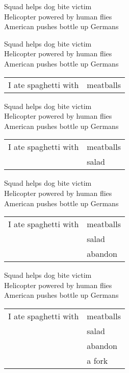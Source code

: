 \documentclass{article}
\begin{document}
\begin{huge}

Squad helps dog bite victim \\
Helicopter powered by human flies\\
American pushes bottle up Germans


Squad helps dog bite victim \\
Helicopter powered by human flies\\
American pushes bottle up Germans\\
\begin{tabular}{ll}I ate spaghetti with & meatballs 
\end{tabular}


Squad helps dog bite victim \\
Helicopter powered by human flies\\
American pushes bottle up Germans\\
\begin{tabular}{ll}I ate spaghetti with & meatballs \\
                                        & salad 
\end{tabular}


Squad helps dog bite victim \\
Helicopter powered by human flies\\
American pushes bottle up Germans\\
\begin{tabular}{ll}I ate spaghetti with & meatballs \\
                                        & salad \\
                                        & abandon 
\end{tabular}



Squad helps dog bite victim \\
Helicopter powered by human flies\\
American pushes bottle up Germans\\
\begin{tabular}{ll}I ate spaghetti with & meatballs \\
                                        & salad \\
                                        & abandon \\
                                        & a fork 
\end{tabular}



\end{huge}
\end{document}
